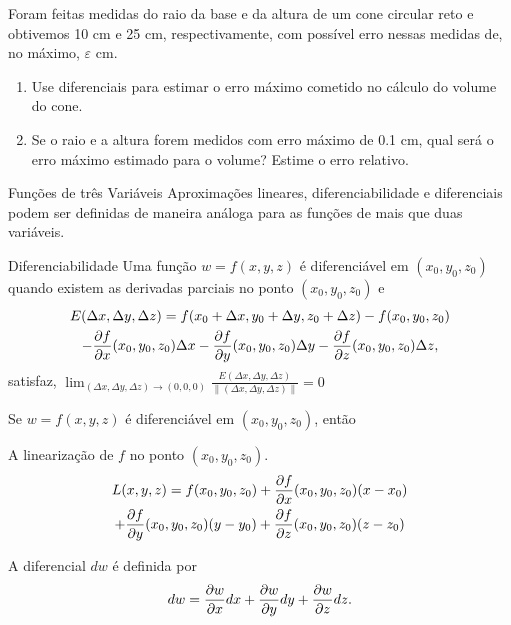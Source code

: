 \begin{frame}[label=der-parciais]
\begin{exe}
Foram feitas medidas do raio da base e da altura de um cone circular reto e obtivemos 10 cm e 25 cm, respectivamente, com possível erro nessas medidas de, no máximo, $\varepsilon$ cm.
\begin{enumerate}
\item Use diferenciais para estimar o erro máximo cometido no cálculo do volume do
cone.

\item Se o raio e a altura forem medidos com erro máximo de 0.1 cm, qual será o erro máximo estimado para o volume? Estime o erro relativo.
\end{enumerate}
\end{exe}
\end{frame}

\begin{frame}[label=der-parciais]{Funções de três Variáveis}
Aproximações lineares, diferenciabilidade e diferenciais podem ser definidas de maneira análoga para as funções de mais que duas variáveis. 
\medskip


\begin{block}{Diferenciabilidade}
Uma função  $w=f(x,y,z)$ é {\color{blue} diferenciável em $(x_0,y_0,z_0)$} quando existem as derivadas parciais no ponto $(x_0,y_0,z_0)$ e 
\begin{multline*}
 E(\Delta x,\Delta y,\Delta z)=
 f(x_0+\Delta x,y_0+\Delta y,z_0+\Delta z)-f(x_0,y_0,z_0)\\-\frac{\partial f}{\partial x}(x_0,y_0,z_0)\Delta x-\frac{\partial f}{\partial y}(x_0,y_0,z_0) \Delta y-\frac{\partial f}{\partial z}(x_0,y_0,z_0)\Delta z,
\end{multline*}
satisfaz, $\displaystyle\lim_{(\Delta x,\Delta y,\Delta z)\to(0,0,0)}\frac{E(\Delta x,\Delta y,\Delta z)}{\|(\Delta x,\Delta y,\Delta z)\|}=0$
\end{block}



\end{frame}



\begin{frame}[label=der-parciais]
Se $w=f(x,y,z)$ é diferenciável em $(x_0,y_0,z_0)$, então 
\bigskip

A {\color{blue}linearização} de $f$ no ponto $(x_0,y_0,z_0)$. 
{\color{blue}\begin{multline*}
L(x,y,z)=f(x_0,y_0,z_0)+\frac{\partial f}{\partial x}(x_0,y_0,z_0)(x-x_0)\\+\frac{\partial f}{\partial y}(x_0,y_0,z_0)(y-y_0)+\frac{\partial f}{\partial z}(x_0,y_0,z_0)(z-z_0)
\end{multline*}}

A {\color{blue}diferencial $dw$}  é definida por
{\color{blue}
\[dw=\frac{\partial w}{\partial x}dx+\frac{\partial w}{\partial y}dy+\frac{\partial w}{\partial z}dz.\]}



\end{frame}


